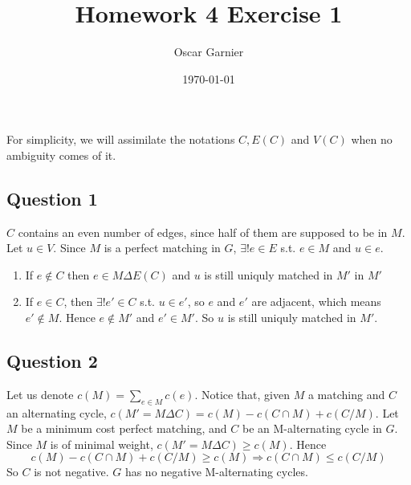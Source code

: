 \documentclass{scrartcl}
\title{Homework 4 Exercise 1}
\author{Oscar Garnier}
\date{\today}
\begin{document}
\newcommand{\E}[1]{\section*{Exo #1}}
\newcommand{\CR}[2]{\section*{#1 // note : #2}}
\newcommand{\Q}[1]{\section*{Exercise #1}}
\newcommand{\SQ}[1]{\subsection*{Question #1}}
\maketitle

For simplicity, we will assimilate the notations \( C, E(C) \) and \( V(C) \) when no ambiguity comes of it.

\SQ{1}

\( C \) contains an even number of edges, since half of them are supposed to be in \( M \).\\
Let \( u \in V \).
Since \( M \) is a perfect matching in \( G \), \( \exists ! e \in E\) s.t. \( e \in M \) and \( u \in e \).
\begin{enumerate}
\item If \( e \not \in C \) then \( e \in M \Delta E(C) \) and \( u \) is still uniquly matched in \( M' \) in \( M' \) 
\item If \( e \in C \), then \( \exists ! e' \in C \) s.t. \( u \in e' \), so \( e \) and \( e' \) are adjacent, which means \( e' \not \in M \). Hence \( e \not \in M'\) and \( e' \in M' \). So \( u \) is still uniquly matched in \( M' \).
\end{enumerate}

\SQ{2}
Let us denote \( c(M) = \sum_{e \in M}c(e) \). Notice that, given \( M \) a matching and \( C \) an alternating cycle, \( c(M' = M \Delta C) = c(M) - c(C \cap M) + c(C / M) \).
Let \( M \) be a minimum cost perfect matching, and \( C \) be an M-alternating cycle in \( G \). Since \( M \) is of minimal weight, \( c(M' = M \Delta C) \geq c(M) \). Hence \[
c(M) - c(C \cap M) + c(C / M) \geq c(M) \Rightarrow c(C \cap M) \leq c( C / M ) \]
So \( C \) is not negative. \( G \) has no negative M-alternating cycles. \\
\end{document}
